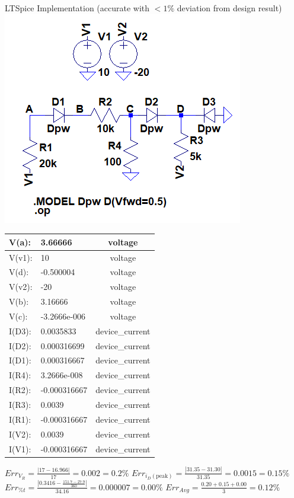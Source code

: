 \documentclass[12pt,letterpaper,titlepage]{article}
\begin{document}
\begin{raggedright}
\begin{center}
LTSpice Implementation (accurate with $< 1\%$ deviation from design result)
\includegraphics[width=.3\textwidth, height=\textheight, keepaspectratio=true]{ds1b}
    \begin{tabular}{|l|l|c|}
  \hline  V(a):   &   3.66666        &  voltage
\\\hline  V(v1):  &   10             &  voltage
\\\hline  V(d):   &   -0.500004      &  voltage
\\\hline  V(v2):  &   -20            &  voltage
\\\hline  V(b):   &   3.16666        &  voltage
\\\hline  V(c):   &   -3.2666e-006   &  voltage
\\\hline  I(D3):  &   0.0035833      &  device\_current
\\\hline  I(D2):  &   0.000316699    &  device\_current
\\\hline  I(D1):  &   0.000316667    &  device\_current
\\\hline  I(R4):  &   3.2666e-008    &  device\_current
\\\hline  I(R2):  &   -0.000316667   &  device\_current
\\\hline  I(R3):  &   0.0039         &  device\_current
\\\hline  I(R1):  &   -0.000316667   &  device\_current
\\\hline  I(V2):  &   0.0039         &  device\_current
\\\hline  I(V1):  &   -0.000316667   &  device\_current
\\\hline
    \end{tabular} 
\begin{paracol}{2}
$Err_{V_R} = \frac{|17-16.966|}{17} = 0.002 = 0.2\%$
\switchcolumn
$Err_{i_D(\text{peak})} = \frac{|31.35-31.30|}{31.35} = 0.0015 = 0.15\%$
\switchcolumn
$Err_{\%t} = \frac{|0.3416-\frac{151.7-27.9}{360}|}{34.16} = 0.000007 = 0.00\%$
\switchcolumn
$Err_{Avg} = \frac{0.20 + 0.15 + 0.00}{3} = 0.12\%$
\end{paracol}
\end{center}


\end{raggedright}
\end{document}
